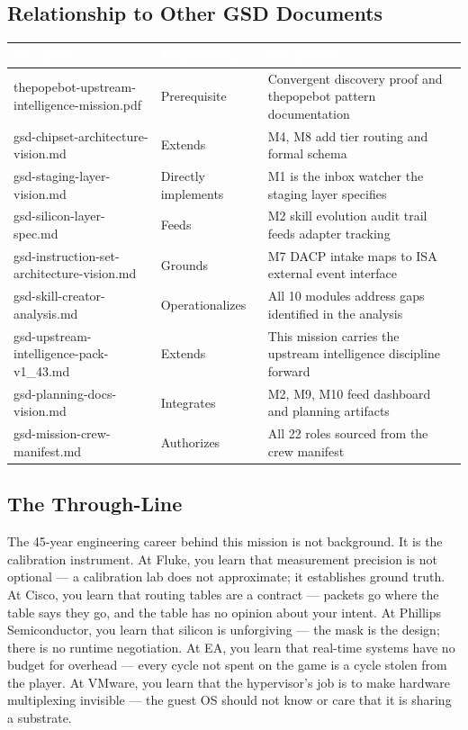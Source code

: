 \documentclass[11pt,letterpaper]{article}
\newcommand{\tableheader}[1]{\textbf{\sffamily\textcolor{white}{#1}}}
\begin{document}
\subsection{Relationship to Other GSD Documents}

\begin{center}
\begin{tabularx}{\textwidth}{L{4.5cm}L{2.5cm}X}
\toprule
{}
\tableheader{Document} & \tableheader{Relationship} & \tableheader{Connection} \\
\midrule
thepopebot-upstream-intelligence-mission.pdf & Prerequisite & Convergent discovery proof and thepopebot pattern documentation \\
gsd-chipset-architecture-vision.md & Extends & M4, M8 add tier routing and formal schema \\
gsd-staging-layer-vision.md & Directly implements & M1 is the inbox watcher the staging layer specifies \\
gsd-silicon-layer-spec.md & Feeds & M2 skill evolution audit trail feeds adapter tracking \\
gsd-instruction-set-architecture-vision.md & Grounds & M7 DACP intake maps to ISA external event interface \\
gsd-skill-creator-analysis.md & Operationalizes & All 10 modules address gaps identified in the analysis \\
gsd-upstream-intelligence-pack-v1\_43.md & Extends & This mission carries the upstream intelligence discipline forward \\
gsd-planning-docs-vision.md & Integrates & M2, M9, M10 feed dashboard and planning artifacts \\
gsd-mission-crew-manifest.md & Authorizes & All 22 roles sourced from the crew manifest \\
\end{tabularx}
\end{center}

\subsection{The Through-Line}

The 45-year engineering career behind this mission is not background. It is the calibration instrument. At Fluke, you learn that measurement precision is not optional --- a calibration lab does not approximate; it establishes ground truth. At Cisco, you learn that routing tables are a contract --- packets go where the table says they go, and the table has no opinion about your intent. At Phillips Semiconductor, you learn that silicon is unforgiving --- the mask is the design; there is no runtime negotiation. At EA, you learn that real-time systems have no budget for overhead --- every cycle not spent on the game is a cycle stolen from the player. At VMware, you learn that the hypervisor's job is to make hardware multiplexing invisible --- the guest OS should not know or care that it is sharing a substrate.
\end{document}
